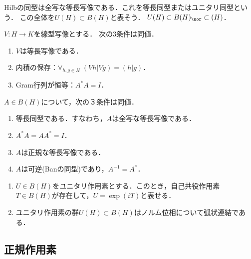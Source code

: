 \documentclass[uplatex,dvipdfmx]{jsreport}
\begin{document}
\begin{tcolorbox}[colframe=ForestGreen, colback=ForestGreen!10!white,breakable,colbacktitle=ForestGreen!40!white,coltitle=black,fonttitle=\bfseries\sffamily,
title=]
    Hilbの同型は全写な等長写像である．これを等長同型またはユニタリ同型という．
    この全体を$U(H)\subset B(H)$と表そう．
    $U(H)\subset B(H)_\nor\subset (H)$．
\end{tcolorbox}

\begin{proposition}[等長写像の特徴付け]\label{prop-characterization-of-isometry}
    $V:H\to K$を線型写像とする．
    次の3条件は同値．
    \begin{enumerate}
        \item $V$は等長写像である．
        \item 内積の保存：$\forall_{h,g\in H}\;(Vh|Vg)=(h|g)$．
        \item Gram行列が恒等：$A^*A=I$．
    \end{enumerate}
\end{proposition}

\begin{proposition}[等長同型の特徴付け]
    $A\in B(H)$について，次の３条件は同値．
    \begin{enumerate}
        \item 等長同型である．すなわち，$A$は全写な等長写像である．
        \item $A^*A=AA^*=I$．
        \item $A$は正規な等長写像である．
        \item $A$は可逆(Banの同型)であり，$A^{-1}=A^*$．
    \end{enumerate}
\end{proposition}

\begin{theorem}\mbox{}
    \begin{enumerate}
        \item $U\in B(H)$をユニタリ作用素とする．このとき，自己共役作用素$T\in B(H)$が存在して，$U=\exp(iT)$と表せる．
        \item ユニタリ作用素の群$U(H)\subset B(H)$はノルム位相について弧状連結である．
    \end{enumerate}
\end{theorem}

\subsection{正規作用素}
\end{document}
